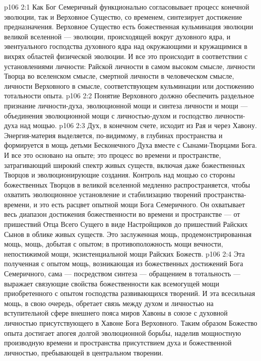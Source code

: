 \vs p106 2:1 Как Бог Семеричный функционально согласовывает процесс конечной эволюции, так и Верховное Существо, со временем, синтезирует достижение предназначения. Верховное Существо есть божественная кульминация эволюции великой вселенной --- эволюции, происходящей вокруг духовного ядра, и эвентуального господства духовного ядра над окружающими и кружащимися в вихрях областей физической эволюции. И все это происходит в соответствии с установлениями личности: Райской личности в самом высоком смысле, личности Творца во вселенском смысле, смертной личности в человеческом смысле, личности Верховного в смысле, соответствующем кульминации или достижению тотальности опыта.
\vs p106 2:2 \pc Понятие Верховного должно обеспечить раздельное признание личности\hyp{}духа, эволюционной мощи и синтеза личности и мощи --- объединения эволюционной мощи с личностью\hyp{}духом и господство личности\hyp{}духа над мощью.
\vs p106 2:3 Дух, в конечном счете, исходит из Рая и через Хавону. Энергия\hyp{}материя выделяется, по\hyp{}видимому, в глубинах пространства и формируется в мощь детьми Бесконечного Духа вместе с Сынами\hyp{}Творцами Бога. И все это основано на опыте; это процесс во времени и пространстве, затрагивающий широкий спектр живых существ, включая даже божественных Творцов и эволюционирующие создания. Контроль над мощью со стороны божественных Творцов в великой вселенной медленно распространяется, чтобы охватить эволюционное установление и стабилизацию творений пространства\hyp{}времени, и это есть расцвет опытной мощи Бога Семеричного. Он охватывает весь диапазон достижения божественности во времени и пространстве --- от пришествий Отца Всего Сущего в виде Настройщиков до пришествий Райских Сынов в облике живых существ. Это заслуженная мощь, продемонстрированная мощь, мощь, добытая с опытом; в противоположность мощи вечности, непостижимой мощи, экзистенциальной мощи Райских Божеств.
\vs p106 2:4 Эта полученная с опытом мощь, возникающая из божественных достижений Бога Семеричного, сама --- посредством синтеза --- обращением в тотальность --- выражает связующие свойства божественности как всемогущей мощи приобретенного с опытом господства развивающихся творений. И эта всесильная мощь, в свою очередь, обретает связь между духом и личностью на вступительной сфере внешнего пояса миров Хавоны в союзе с духовной личностью присутствующего в Хавоне Бога Верховного. Таким образом Божество опыта достигает апогея долгой эволюционной борьбы, наделив мощностную производную времени и пространства присутствием духа и божественной личностью, пребывающей в центральном творении.
